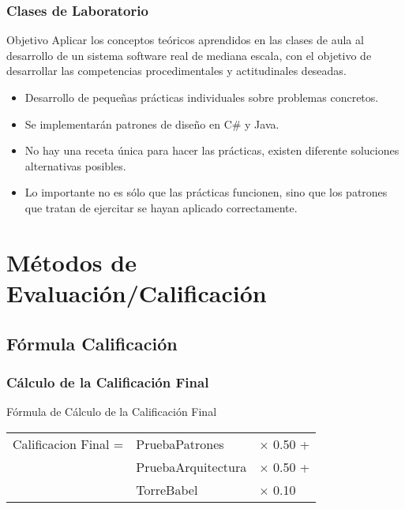 \documentclass[a4paper,slidestop,xcolor=pst,blue]{beamer}
\begin{document}
\begin{frame}[c]
	\frametitle{Clases de Laboratorio}
	\begin{block}{Objetivo}
        Aplicar los conceptos teóricos aprendidos en las clases de aula al desarrollo de un sistema software real de mediana escala, con el objetivo de desarrollar las competencias procedimentales y actitudinales deseadas.
	\end{block}
	\begin{itemize}
        \item<2-> Desarrollo de pequeñas prácticas individuales sobre problemas concretos.
        \item<3-> Se implementarán patrones de diseño en C\# y Java.
        \item<4-> No hay una receta única para hacer las prácticas, existen diferente soluciones alternativas posibles.
        \item<5-> Lo importante no es sólo que las prácticas funcionen, sino que los patrones que tratan de ejercitar se hayan aplicado correctamente.
	\end{itemize}
\end{frame}

\section{Métodos de Evaluación/Calificación}

\subsection{Fórmula Calificación}

\begin{frame}[c]
	\frametitle{Cálculo de la Calificación Final}
	\begin{block}{Fórmula de Cálculo de la Calificación Final}
		\begin{tabular}{lll}
			Calificacion Final  =  & PruebaPatrones     & $\times$ 0.50 + \\
                                   & PruebaArquitectura & $\times$ 0.50 + \\
                                   & TorreBabel         & $\times$ 0.10 \\
		\end{tabular}
	\end{block}
\end{frame}
\end{document}
